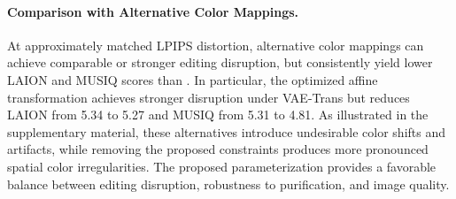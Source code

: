 \paragraph{Comparison with Alternative Color Mappings.}
At approximately matched LPIPS distortion, alternative color mappings can achieve comparable or stronger editing disruption, but consistently yield lower LAION and MUSIQ scores than \capg{}. In particular, the optimized affine transformation achieves stronger disruption under VAE-Trans but reduces LAION from 5.34 to 5.27 and MUSIQ from 5.31 to 4.81. As illustrated in the supplementary material, these alternatives introduce undesirable color shifts and artifacts, while removing the proposed constraints produces more pronounced spatial color irregularities. The proposed parameterization provides a favorable balance between editing disruption, robustness to purification, and image quality.





